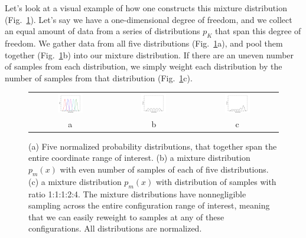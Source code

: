 \documentclass[aps,pre,twocolumn,superscriptaddress]{revtex4-1}
\begin{document}
Let's look at a visual example of how one constructs this mixture
distribution (Fig.~\ref{figure:mixture}).  Let's say we have a
one-dimensional degree of freedom, and we collect an equal amount of
data from a series of distributions $p_K$ that span this degree of
freedom.  We gather data from all five distributions
(Fig.~\ref{figure:mixture}a), and pool them together
(Fig.~\ref{figure:mixture}b) into our mixture distribution. If there
are an uneven number of samples from each distribution, we simply
weight each distribution by the number of samples from that
distribution (Fig.~\ref{figure:mixture}c).

\begin{figure}
\begin{tabular}{ccc}
\includegraphics[width=0.33\textwidth]{constN_numf4}&
\includegraphics[width=0.33\textwidth]{constN_mix.pdf}&
\includegraphics[width=0.33\textwidth]{varN_mix.pdf} \\
a & b & c
\end{tabular}
\caption{(a) Five normalized probability distributions, that together
  span the entire coordinate range of interest. (b) a mixture
  distribution $p_m(x)$ with even number of samples of each of five
  distributions. (c) a mixture distribution $p_m(x)$ with distribution
  of samples with ratio 1:1:1:2:4. The mixture distributions have
  nonnegligible sampling across the entire configuration range of
  interest, meaning that we can easily reweight to samples at any of
  these configurations. All distributions are normalized.}
\label{figure:mixture}
\end{figure}
\end{document}
